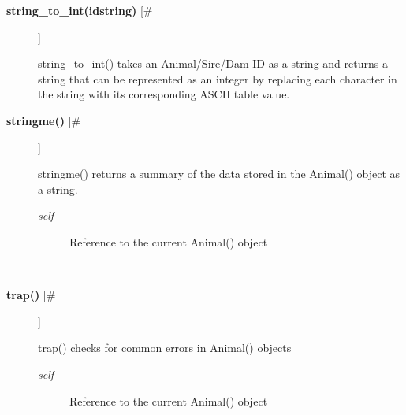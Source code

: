 \begin{description}
\item[\textbf{string\_to\_int(idstring)}
 [\#]]

 string\_to\_int() takes an Animal/Sire/Dam ID as a string and returns a string that can be represented as an integer by replacing each character in the string with its corresponding ASCII table value.

\item[\textbf{stringme()}
 [\#]]

 stringme() returns a summary of the data stored in the Animal() object as a string.
\begin{description}
\item[\emph{self}
] Reference to the current Animal() object

\end{description}
\\ 

\item[\textbf{trap()}
 [\#]]

 trap() checks for common errors in Animal() objects
\begin{description}
\item[\emph{self}
] Reference to the current Animal() object

\end{description}
\\ 


\end{description}
